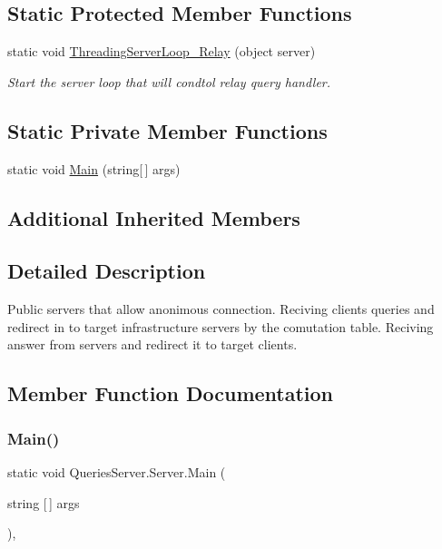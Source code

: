 \subsection*{Static Protected Member Functions}
\begin{DoxyCompactItemize}
\item 
static void \mbox{\hyperlink{class_queries_server_1_1_server_af78ec354d7f465d29800f812996dc91b}{Threading\+Server\+Loop\+\_\+\+Relay}} (object server)
\begin{DoxyCompactList}\small\item\em Start the server loop that will condtol relay query handler. \end{DoxyCompactList}\end{DoxyCompactItemize}
\subsection*{Static Private Member Functions}
\begin{DoxyCompactItemize}
\item 
static void \mbox{\hyperlink{class_queries_server_1_1_server_ae294b75511557ef0701455c0e2ba785d}{Main}} (string\mbox{[}$\,$\mbox{]} args)
\end{DoxyCompactItemize}
\subsection*{Additional Inherited Members}


\subsection{Detailed Description}
Public servers that allow anonimous connection. Reciving clients\textquotesingle{} queries and redirect in to target infrastructure servers by the comutation table. Reciving answer from servers and redirect it to target clients. 



\subsection{Member Function Documentation}
\mbox{\label{class_queries_server_1_1_server_ae294b75511557ef0701455c0e2ba785d}} 
\subsubsection{\texorpdfstring{Main()}{Main()}}
{\footnotesize\ttfamily static void Queries\+Server.\+Server.\+Main (\begin{DoxyParamCaption}\item[{string \mbox{[}$\,$\mbox{]}}]{args }\end{DoxyParamCaption})\hspace{0.3cm}{\ttfamily [static]}, {\ttfamily [private]}}

